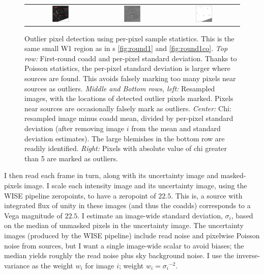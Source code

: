 \documentclass[11pt,preprint]{aastex}
\newcommand{\wt}{w}
\begin{document}
\begin{figure}
\begin{center}
\begin{tabular}{@{}ccc@{}}
\includegraphics[width=0.25\textwidth]{plots1/sequels-035} &
\includegraphics[width=0.25\textwidth]{plots1/sequels-037} &
\includegraphics[width=0.25\textwidth]{plots1/sequels-038}
\end{tabular}
\end{center}
\caption{Outlier pixel detection using per-pixel sample statistics.
  This is the same small W1 region as in \figurename s
  \ref{fig:round1} and \ref{fig:round1co}.  \emph{Top row:}
  First-round coadd and per-pixel standard deviation.  Thanks to
  Poisson statistics, the per-pixel standard deviation is larger where
  sources are found.  This avoids falsely marking too many pixels near
  sources as outliers.  \emph{Middle and Bottom rows, left:} Resampled
  images, with the locations of detected outlier pixels marked.
  Pixels near sources are occasionally falsely mark as outliers.
  \emph{Center:} Chi: resampled image minus coadd mean, divided by
  per-pixel standard deviation (after removing image $i$ from the mean
  and standard deviation estimates).  The large blemishes in the
  bottom row are readily identified.  \emph{Right:} Pixels with
  absolute value of chi greater than 5 are marked as outliers.
\label{fig:round2}}
\end{figure}


I then read each frame in turn, along with its uncertainty image and
masked-pixels image.  I scale each intensity image and its
uncertainty image, using the WISE pipeline zeropoints, to have a
zeropoint of $22.5$.
%
This is, a source with integrated flux of unity in these images (and
thus the coadds) corresponds to a Vega magnitude of $22.5$.
%
I estimate an image-wide standard deviation, $\sigma_i$, based on the
median of unmasked pixels in the uncertainty image.  The uncertainty
images (produced by the WISE pipeline) include read noise and
pixelwise Poisson noise from sources, but I want a single image-wide
scalar to avoid biases; the median yields roughly the read noise plus
sky background noise.  I use the inverse-variance as the weight
$\wt_i$ for image $i$; weight $\wt_i = {\sigma_i}^{-2}$.
%
\end{document}
